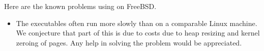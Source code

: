 
Here are the known problems using {\mlton} on FreeBSD.

\begin{itemize}

\item
The executables often run more slowly than on a comparable Linux
machine.  We conjecture that part of this is due to costs due to heap
resizing and kernel zeroing of pages.  Any help in solving the problem
would be appreciated.

\end{itemize}
